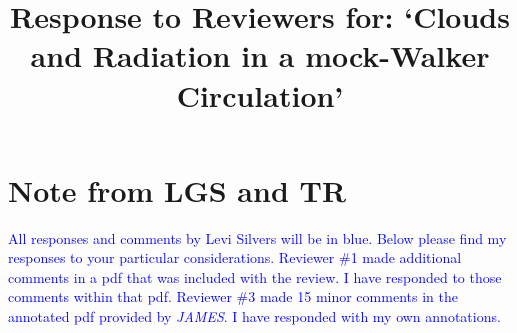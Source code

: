 \documentclass[draft]{agujournal2019}
\begin{document}
%
%


\title{Response to Reviewers for: `Clouds and Radiation in a mock-Walker Circulation'}

%
%















\section{Note from LGS and TR}

\textcolor{blue}{All responses and comments by Levi Silvers will be in blue.  Below please find my responses to your particular considerations.  Reviewer \#1 made additional comments in a pdf that was included with the review.  I have responded to those comments within that pdf.  Reviewer \#3 made 15 minor comments in the annotated pdf provided by \textit{JAMES}.  I have responded with my own annotations. }
\end{document}
